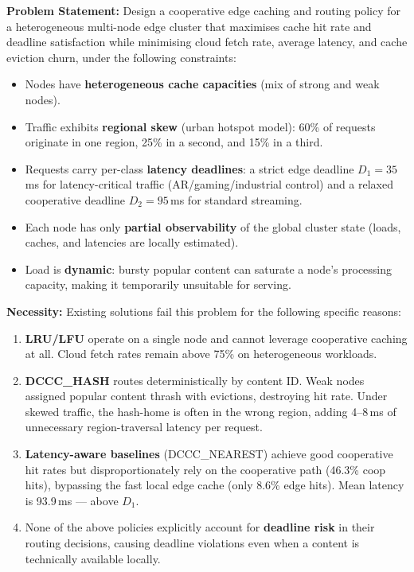 \documentclass[12pt,a4paper]{report}
\begin{document}
\noindent\textbf{Problem Statement:}
Design a cooperative edge caching and routing policy for a heterogeneous multi-node edge
cluster that maximises cache hit rate and deadline satisfaction while minimising cloud fetch
rate, average latency, and cache eviction churn, under the following constraints:

\begin{itemize}
  \item Nodes have \textbf{heterogeneous cache capacities} (mix of strong and weak nodes).
  \item Traffic exhibits \textbf{regional skew} (urban hotspot model): 60\% of requests
        originate in one region, 25\% in a second, and 15\% in a third.
  \item Requests carry per-class \textbf{latency deadlines}: a strict edge deadline
        $D_1 = 35$\,ms for latency-critical traffic (AR/gaming/industrial control) and a
        relaxed cooperative deadline $D_2 = 95$\,ms for standard streaming.
  \item Each node has only \textbf{partial observability} of the global cluster state
        (loads, caches, and latencies are locally estimated).
  \item Load is \textbf{dynamic}: bursty popular content can saturate a node's processing
        capacity, making it temporarily unsuitable for serving.
\end{itemize}

\noindent\textbf{Necessity:}
Existing solutions fail this problem for the following specific reasons:

\begin{enumerate}
  \item \textbf{LRU/LFU} operate on a single node and cannot leverage cooperative caching
        at all. Cloud fetch rates remain above 75\% on heterogeneous workloads.
  \item \textbf{DCCC\_HASH} routes deterministically by content ID. Weak nodes assigned
        popular content thrash with evictions, destroying hit rate. Under skewed traffic, the
        hash-home is often in the wrong region, adding 4--8\,ms of unnecessary region-traversal
        latency per request.
  \item \textbf{Latency-aware baselines} (DCCC\_NEAREST) achieve good cooperative hit rates
        but disproportionately rely on the cooperative path (46.3\% coop hits), bypassing the
        fast local edge cache (only 8.6\% edge hits). Mean latency is 93.9\,ms --- above $D_1$.
  \item None of the above policies explicitly account for \textbf{deadline risk} in their routing
        decisions, causing deadline violations even when a content is technically available locally.
\end{enumerate}
\end{document}
